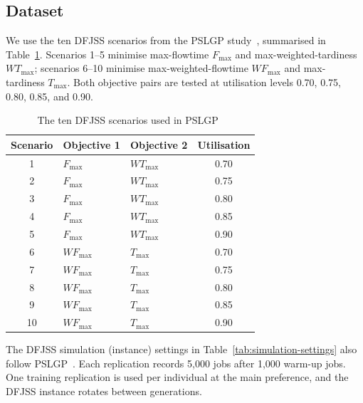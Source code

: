 \documentclass[10pt,journal]{IEEEtran}
\begin{document}
\subsection{Dataset}
We use the ten DFJSS scenarios from the PSLGP study~\cite{xu2026pslgp}, summarised in Table~\ref{tab:pslgp-scenarios}. Scenarios 1--5 minimise max-flowtime $F_{\max}$ and max-weighted-tardiness $WT_{\max}$; scenarios 6--10 minimise max-weighted-flowtime $WF_{\max}$ and max-tardiness $T_{\max}$. Both objective pairs are tested at utilisation levels 0.70, 0.75, 0.80, 0.85, and 0.90.

\begin{table}[t]
\centering
\caption{The ten DFJSS scenarios used in PSLGP~\cite{xu2026pslgp}}
\label{tab:pslgp-scenarios}
\footnotesize
\begin{tabular}{cllc}
\toprule
Scenario & Objective 1 & Objective 2 & Utilisation \\
\midrule
1 & $F_{\max}$ & $WT_{\max}$ & 0.70 \\
2 & $F_{\max}$ & $WT_{\max}$ & 0.75 \\
3 & $F_{\max}$ & $WT_{\max}$ & 0.80 \\
4 & $F_{\max}$ & $WT_{\max}$ & 0.85 \\
5 & $F_{\max}$ & $WT_{\max}$ & 0.90 \\
\midrule
6 & $WF_{\max}$ & $T_{\max}$ & 0.70 \\
7 & $WF_{\max}$ & $T_{\max}$ & 0.75 \\
8 & $WF_{\max}$ & $T_{\max}$ & 0.80 \\
9 & $WF_{\max}$ & $T_{\max}$ & 0.85 \\
10 & $WF_{\max}$ & $T_{\max}$ & 0.90 \\
\bottomrule
\end{tabular}
\end{table}

The DFJSS simulation (instance) settings in Table~\ref{tab:simulation-settings} also follow PSLGP~\cite{xu2026pslgp}. Each replication records 5,000 jobs after 1,000 warm-up jobs. One training replication is used per individual at the main preference, and the DFJSS instance rotates between generations.
\end{document}
